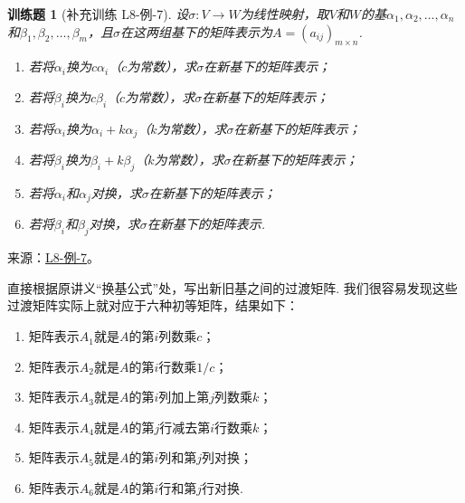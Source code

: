 \documentclass[UTF8,12pt,a4paper,fontset=fandol]{ctexart}
\newtheorem{exercise}{训练题}[section]
\begin{document}
\begin{exercise}[补充训练 L8-例-7]\label{prob:L8-例-7}
设$\sigma:V\to W$为线性映射，取$V$和$W$的基$\alpha_1,\alpha_2,\ldots,\alpha_n$和$\beta_1,\beta_2,\ldots,\beta_m$，且$\sigma$在这两组基下的矩阵表示为$A=(a_{ij})_{m\times n}$.
    \begin{enumerate}
        \item 若将$\alpha_i$换为$c\alpha_i$（$c$为常数），求$\sigma$在新基下的矩阵表示；

        \item 若将$\beta_i$换为$c\beta_i$（$c$为常数），求$\sigma$在新基下的矩阵表示；

        \item 若将$\alpha_i$换为$\alpha_i+k\alpha_j$（$k$为常数），求$\sigma$在新基下的矩阵表示；

        \item 若将$\beta_i$换为$\beta_i+k\beta_j$（$k$为常数），求$\sigma$在新基下的矩阵表示；

        \item 若将$\alpha_i$和$\alpha_j$对换，求$\sigma$在新基下的矩阵表示；

        \item 若将$\beta_i$和$\beta_j$对换，求$\sigma$在新基下的矩阵表示.
    \end{enumerate}
\end{exercise}
\noindent 来源：\href{https://github.com/yhwu-is/Linear-Algebra-Left-Undone/blob/new/%E8%AE%B2%E4%B9%89/%E4%B8%93%E9%A2%98/8%20%E7%9B%B8%E6%8A%B5%E6%A0%87%E5%87%86%E5%BD%A2.tex}{L8-例-7}。
\begin{solve}
直接根据原讲义“换基公式”处，写出新旧基之间的过渡矩阵. 我们很容易发现这些过渡矩阵实际上就对应于六种初等矩阵，结果如下：
    \begin{enumerate}
        \item 矩阵表示$A_1$就是$A$的第$i$列数乘$c$；

        \item 矩阵表示$A_2$就是$A$的第$i$行数乘$1/c$；

        \item 矩阵表示$A_3$就是$A$的第$i$列加上第$j$列数乘$k$；

        \item 矩阵表示$A_4$就是$A$的第$j$行减去第$i$行数乘$k$；

        \item 矩阵表示$A_5$就是$A$的第$i$列和第$j$列对换；

        \item 矩阵表示$A_6$就是$A$的第$i$行和第$j$行对换.
    \end{enumerate}
\end{solve}
\end{document}
